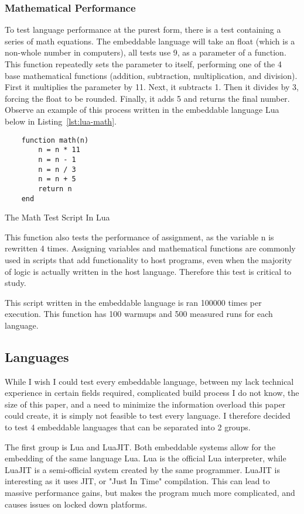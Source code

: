 \subsubsection{Mathematical Performance}
To test language performance at the purest form, there is a test containing a series of math equations. The embeddable language will take an float (which is a non-whole number in computers), all tests use 9, as a parameter of a function. This function repeatedly sets the parameter to itself, performing one of the 4 base mathematical functions (addition, subtraction, multiplication, and division). First it multiplies the parameter by 11. Next, it subtracts 1. Then it divides by 3, forcing the float to be rounded. Finally, it adds 5 and returns the final number. Observe an example of this process written in the embeddable language Lua below in Listing~\ref{lst:lua-math}.

\begin{listing}[H]
    \begin{verbatim}
    function math(n)
        n = n * 11
        n = n - 1
        n = n / 3
        n = n + 5
        return n
    end
    \end{verbatim}
    \caption{The Math Test Script In Lua}
    \label{lst:lua-math}
\end{listing}

This function also tests the performance of assignment, as the variable n is rewritten 4 times. Assigning variables and mathematical functions are commonly used in scripts that add functionality to host programs, even when the majority of logic is actually written in the host language. Therefore this test is critical to study.

This script written in the embeddable language is ran 100000 times per execution. This function has 100 warmups and 500 measured runs for each language.

\subsection{Languages}
While I wish I could test every embeddable language, between my lack technical experience in certain fields required, complicated build process I do not know, the size of this paper, and a need to minimize the information overload this paper could create, it is simply not feasible to test every language. I therefore decided to test 4 embeddable languages that can be separated into 2 groups.

The first group is Lua and LuaJIT. Both embeddable systems allow for the embedding of the same language Lua. Lua is the official Lua interpreter, while LuaJIT is a semi-official system created by the same programmer. LuaJIT is interesting as it uses JIT, or "Just In Time" compilation. This can lead to massive performance gains, but makes the program much more complicated, and causes issues on locked down platforms.

